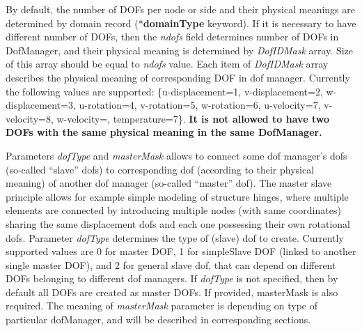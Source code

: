\documentclass[draft]{article}
\newcommand{\param}[1]{{\em #1}}
\newcommand{\entKeyword}[1]{\mbox{{*{\bf{#1}}}}}
\begin{document}
By default, the number of DOFs per node or side  and their physical meanings are determined by domain record (\entKeyword{domainType} keyword).
If it is necessary to have
different number of DOFs, then the \param{ndofs} field
determines number of DOFs in DofManager, and their physical meaning is
determined by \param{DofIDMask} array. Size of this array
should be equal to \param{ndofs} value. Each item of \param{DofIDMask}
array describes the physical meaning of corresponding DOF in dof manager. Currently
the following values are supported: \{u-displacement=1, v-displacement=2,
 w-displacement=3, u-rotation=4, v-ro\-ta\-tion=5, w-rotation=6, u-velocity=7, v-velocity=8, w-velocity=, 
temperature=7\}. {\bf It is not allowed to have two DOFs
with the same physical meaning in the same DofManager.}

Parameters \param{dofType} and \param{masterMask} allows to connect some dof manager's dofs
(so-called ``slave'' dofs)
to corresponding dof (according to their physical meaning) of another
dof manager (so-called ``master'' dof). The master slave principle
allows for example simple modeling of structure hinges, where multiple
elements are connected by introducing multiple nodes (with same
coordinates) sharing the same displacement dofs and each one possessing
their own rotational dofs.
Parameter
\param{dofType} determines the type of (slave) dof to
create. Currently supported values are 0 for master DOF, 1 for simpleSlave DOF (linked to another single master DOF), and 2 for general
slave dof, that can depend on different DOFs belonging to different
dof managers. 
If \param{dofType} is not specified, then by default all DOFs are
created as master DOFs. If provided, masterMask is also required. 
The meaning of \param{masterMask} parameter is
depending on type of particular dofManager, and will be described in
corresponding sections.
\end{document}
